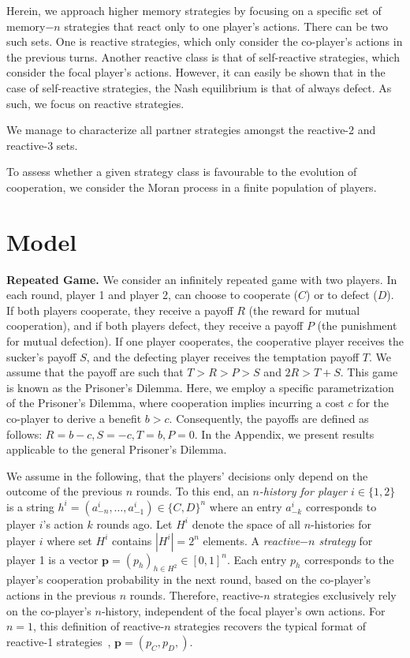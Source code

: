 \documentclass{article}
\theoremstyle{definition}
\begin{document}
Herein, we approach higher memory strategies by focusing on a specific set of
memory$-n$ strategies that react only to one player's actions. There can be two
such sets. One is reactive strategies, which only consider the co-player's
actions in the previous turns. Another reactive class is that of self-reactive
strategies, which consider the focal player's actions. However, it can easily be
shown that in the case of self-reactive strategies, the Nash equilibrium is that
of always defect. As such, we focus on reactive strategies.

We manage to characterize all partner strategies amongst the reactive-2 and
reactive-3 sets.

To assess whether a given strategy class is favourable to the evolution of
cooperation, we consider the Moran process in a finite population of players.

\section{Model}

\textbf{Repeated Game.}
We consider an infinitely repeated game with two players. In each round, player 1
and player 2, can choose to cooperate ($C$) or to defect ($D$). If both players
cooperate, they receive a payoff $R$ (the reward for mutual cooperation), and if
both players defect, they receive a payoff $P$ (the punishment for mutual
defection). If one player cooperates, the cooperative player receives the
sucker's payoff $S$, and the defecting player receives the temptation payoff
$T$. We assume that the payoff are such that $T > R > P > S$ and $2 R > T + S$.
This game is known as the Prisoner's Dilemma. Here, we
employ a specific parametrization of the Prisoner's Dilemma, where cooperation
implies incurring a cost $c$ for the co-player to derive a benefit $b > c$.
Consequently, the payoffs are defined as follows: \(R = b - c, S = -c, T = b, P =
0\). In the Appendix, we present results applicable to the general Prisoner's
Dilemma.

We assume in the following, that the players' decisions only depend on the
outcome of the previous $n$ rounds. To this end, an {\it $n$-history for player
$i \in \{1, 2\}$} is a string $h^i=(a^i_{-n},\ldots,a^i_{-1})\!\in\!\{C,D\}^n$
where an entry $a^i_{-k}$ corresponds to player $i$'s action $k$ rounds ago. Let
$H^i$ denote the space of all $n$-histories for player $i$ where set $H^i$ contains
$|H^i|=2^{n}$ elements. A {\it reactive$-n$ strategy} for player 1 is a vector
$\mathbf{p}=(p_h)_{h\in H^2} \in [0, 1]^{n}$. Each entry $p_h$ corresponds to
the player's cooperation probability in the next round, based on the co-player's
actions in the previous $n$ rounds. Therefore, reactive-$n$ strategies
exclusively rely on the co-player's $n$-history, independent of the focal
player's own actions. For \(n=1\), this definition of reactive-\(n\) strategies
recovers the typical format of reactive-1 strategies~\cite{baek:scientific:2016, wahl:JTB:1999, mcavoy:PRSA:2019},
\(\mathbf{p}=(p_C, p_D,)\).
\end{document}
